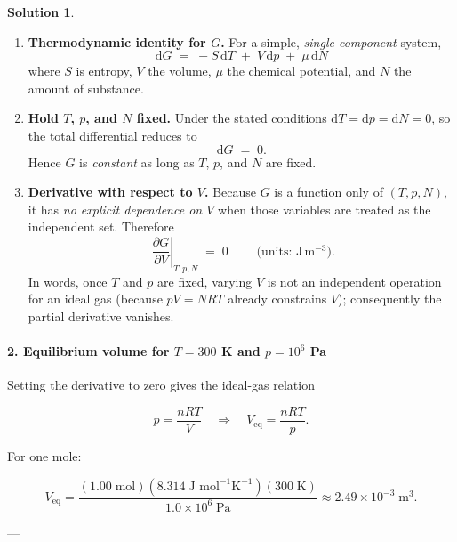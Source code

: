 \documentclass[12pt]{article}
\theoremstyle{definition} %
\newtheorem{solution}{Solution}
\theoremstyle{plain} %
\begin{document}
  \begin{solution}
  \begin{enumerate}
      \item \textbf{Thermodynamic identity for $G$.}  
            For a simple, \emph{single‐component} system,
            \[
                \boxed{\;\mathrm{d}G \;=\; -S\,\mathrm{d}T \;+\; V\,\mathrm{d}p \;+\; \mu\,\mathrm{d}N\;}
            \]
            where $S$ is entropy, $V$ the volume, $\mu$ the chemical potential, and $N$ the amount of substance.
      \item \textbf{Hold $T$, $p$, and $N$ fixed.}  
            Under the stated conditions $\mathrm{d}T=\mathrm{d}p=\mathrm{d}N=0$, so the total differential reduces to
            \[
                \mathrm{d}G\;=\;0.
            \]
            Hence $G$ is \emph{constant} as long as $T$, $p$, and $N$ are fixed.
      \item \textbf{Derivative with respect to $V$.}  
            Because $G$ is a function only of $(T,p,N)$, it has \emph{no explicit dependence on $V$} when those variables are treated as the independent set.  Therefore
            \[
                \boxed{\;\left.\frac{\partial G}{\partial V}\right|_{T,p,N}\;=\;0\;}
                \qquad\bigl(\text{units: } \text{J}\,\text{m}^{-3}\bigr).
            \]
            In words, once $T$ and $p$ are fixed, varying $V$ is not an independent operation for an ideal gas (because $pV = NRT$ already constrains $V$); consequently the partial derivative vanishes.
  \end{enumerate}
  \end{solution}

\paragraph{2.  Equilibrium volume for $T=300$ K and $p=10^{6}$ Pa}

Setting the derivative to zero gives the ideal-gas relation

\[
  p = \frac{nRT}{V}
  \quad\Longrightarrow\quad
  V_{\text{eq}} = \frac{nRT}{p}.
\]

For one mole:

\[
  V_{\text{eq}}
  = \frac{(1.00\;\text{mol})(8.314\;\text{J mol}^{-1}\text{K}^{-1})(300\;\text{K})}
         {1.0\times10^{6}\;\text{Pa}}
  \approx \boxed{2.49\times10^{-3}\;\text{m}^{3}}.
\]

---

\end{document}

